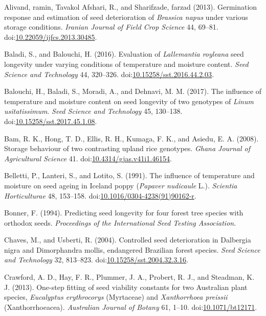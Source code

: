 \documentclass[]{article}
\begin{document}
\leavevmode\hypertarget{ref-alivand_germination_2013}{}%
Alivand, ramin, Tavakol Afshari, R., and Sharifzade, farzad (2013).
Germination response and estimation of seed deterioration of
\emph{Brassica napus} under various storage conditions. \emph{Iranian
Journal of Field Crop Science} 44, 69--81.
doi:\href{https://doi.org/10.22059/ijfcs.2013.30485}{10.22059/ijfcs.2013.30485}.

\leavevmode\hypertarget{ref-baladi_evaluation_2016}{}%
Baladi, S., and Balouchi, H. (2016). Evaluation of \emph{Lallemantia
royleana} seed longevity under varying conditions of temperature and
moisture content. \emph{Seed Science and Technology} 44, 320--326.
doi:\href{https://doi.org/10.15258/sst.2016.44.2.03}{10.15258/sst.2016.44.2.03}.

\leavevmode\hypertarget{ref-balouchi_influence_2017}{}%
Balouchi, H., Baladi, S., Moradi, A., and Dehnavi, M. M. (2017). The
influence of temperature and moisture content on seed longevity of two
genotypes of \emph{Linum usitatissimum}. \emph{Seed Science and
Technology} 45, 130--138.
doi:\href{https://doi.org/10.15258/sst.2017.45.1.08}{10.15258/sst.2017.45.1.08}.

\leavevmode\hypertarget{ref-bam_storage_2008}{}%
Bam, R. K., Hong, T. D., Ellis, R. H., Kumaga, F. K., and Asiedu, E. A.
(2008). Storage behaviour of two contrasting upland rice genotypes.
\emph{Ghana Journal of Agricultural Science} 41.
doi:\href{https://doi.org/10.4314/gjas.v41i1.46154}{10.4314/gjas.v41i1.46154}.

\leavevmode\hypertarget{ref-belletti_influence_1991}{}%
Belletti, P., Lanteri, S., and Lotito, S. (1991). The influence of
temperature and moisture on seed ageing in Iceland poppy (\emph{Papaver
nudicaule} L.). \emph{Scientia Horticulturae} 48, 153--158.
doi:\href{https://doi.org/10.1016/0304-4238(91)90162-r}{10.1016/0304-4238(91)90162-r}.

\leavevmode\hypertarget{ref-bonner_predicting_1994}{}%
Bonner, F. (1994). Predicting seed longevity for four forest tree
species with orthodox seeds. \emph{Proceedings of the International Seed
Testing Association}.

\leavevmode\hypertarget{ref-chaves_controlled_2004}{}%
Chaves, M., and Usberti, R. (2004). Controlled seed deterioration in
Dalbergia nigra and Dimorphandra mollis, endangered Brazilian forest
species. \emph{Seed Science and Technology} 32, 813--823.
doi:\href{https://doi.org/10.15258/sst.2004.32.3.16}{10.15258/sst.2004.32.3.16}.

\leavevmode\hypertarget{ref-crawford_one-step_2013}{}%
Crawford, A. D., Hay, F. R., Plummer, J. A., Probert, R. J., and
Steadman, K. J. (2013). One-step fitting of seed viability constants for
two Australian plant species, \emph{Eucalyptus erythrocorys} (Myrtaceae)
and \emph{Xanthorrhoea preissii} (Xanthorrhoeacea). \emph{Australian
Journal of Botany} 61, 1--10.
doi:\href{https://doi.org/10.1071/bt12171}{10.1071/bt12171}.
\end{document}

